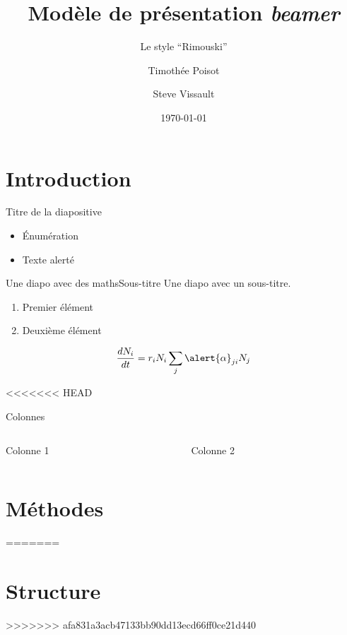 \documentclass{eecslides}
\title[Modèle \emph{beamer}]{Modèle de présentation \emph{beamer}}
\subtitle{Le style ``Rimouski''}
\author[Tim \& Steve]{Timothée Poisot \and Steve Vissault}
\institute[Chaire de recherche EEC]{UQAR -- Chaire de Recherche EEC}
\date{\today}
\begin{document}
	\begin{frame}[plain]
		\titlepage
	\end{frame}

	\begin{frame}[plain]
		\tableofcontents
	\end{frame}

	\section{Introduction}

	\begin{frame}{Titre de la diapositive}
	    
		\begin{itemize}
			\item Énumération
			\item Texte \alert{alerté} 
		\end{itemize}
	
	\end{frame}

	\begin{frame}{Une diapo avec des maths}{Sous-titre}
		Une diapo avec un sous-titre.

		\begin{enumerate}
			\item Premier élément
			\item Deuxième élément
		\end{enumerate}

		$$\frac{dN_i}{dt} = r_iN_i\sum_j\alert{\alpha}_{ji}N_j$$

	\end{frame}

<<<<<<< HEAD
	\begin{frame}{Colonnes}
		
		\begin{columns}
			\begin{column}[t]{0.5\textwidth}
				Colonne 1
			\end{column}
			\begin{column}[t]{0.5\textwidth}
				Colonne 2
			\end{column}
		\end{columns}

	\end{frame}

	\section{Méthodes}
=======
	\section{Structure}
>>>>>>> afa831a3acb47133bb90dd13ecd66ff0ce21d440
\end{document}

